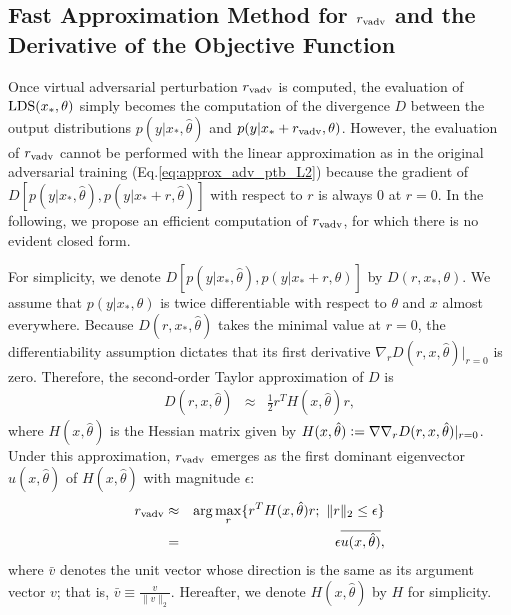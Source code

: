 \documentclass[10pt,journal,compsoc]{IEEEtran}
\newcommand{\defeq}{\vcentcolon=}
\begin{document}
\subsection{\label{subsec:fastapprox}Fast Approximation Method for $r_{\rm vadv}$ 
and the Derivative of the Objective Function}
Once virtual adversarial perturbation $r_{\rm vadv}$ is computed, the evaluation of ${\rm LDS}(x_*, \theta)$ simply becomes the computation of the divergence $D$ between the output distributions $p(y |x_{*},\hat{\theta})$ and $p(y|x_{*} + r_{\rm vadv},\theta)$.
However, the evaluation of $r_{\rm vadv}$ cannot be performed with the linear approximation as in the original adversarial training (Eq.\eqref{eq:approx_adv_ptb_L2}) because the gradient of $D[p(y|x_{*},\hat{\theta}), p(y|x_{*}+r, \hat{\theta})]$ with respect to $r$ is always $0$ at $r=0$.
In the following, we propose an efficient computation of $r_{\rm vadv}$, for which there is no evident closed form. 

For simplicity, we denote $D[p(y|x_{*},\hat{\theta}), p(y|x_{*}+r, \theta)]$ by $D(r,x_{*}, \theta)$. 
We assume that $p(y |x_{*},\theta)$ is twice differentiable with respect to $\theta$ and $x$ almost everywhere. 
Because $D(r,x_*,\hat{\theta})$ takes the minimal value at $r = 0$, the differentiability assumption dictates that its first derivative $\nabla_r D(r,x,\hat{\theta})|_{r=0}$ is zero.  Therefore, the second-order Taylor approximation of $D$ is 
\begin{eqnarray}
	D(r,x,\hat{\theta}) &\approx&  \frac{1}{2}r^{T}H(x,\hat{\theta}) r, \label{eq:second_taylor}
\end{eqnarray}
where $ H(x,\hat{\theta})$ is the Hessian matrix given by $ H(x,\hat{\theta}) \defeq \nabla\nabla_{r} D(r,x,\hat{\theta})|_{r=0}$. 
Under this approximation, $r_{\rm vadv}$ emerges as the first dominant eigenvector $u(x,\hat{\theta})$ of $H(x,\hat{\theta})$ with magnitude $\epsilon$: %
\begin{eqnarray}
r_{\rm vadv} &\approx& \arg \mathop {\rm max}\limits_r \{r^{T} H(x, \hat{\theta}) r; ~\|r\|_2 \leq \epsilon\}  \nonumber \\
&=& \epsilon \overline{u(x, \hat{\theta})}, 
\end{eqnarray} 
where $\bar{v}$ denotes the unit vector whose direction is the same as its argument vector $v$; that is, $\bar{v} \equiv \frac{v}{\| v \|_2}$.
Hereafter, we denote $H(x,\hat{\theta})$ by $H$ for simplicity.
\end{document}
